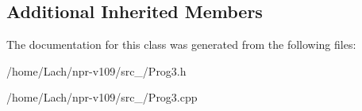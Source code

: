 \subsection*{Additional Inherited Members}


The documentation for this class was generated from the following files\+:\begin{DoxyCompactItemize}
\item 
/home/\+Lach/npr-\/v109/src\+\_/Prog3.\+h\item 
/home/\+Lach/npr-\/v109/src\+\_/Prog3.\+cpp\end{DoxyCompactItemize}
